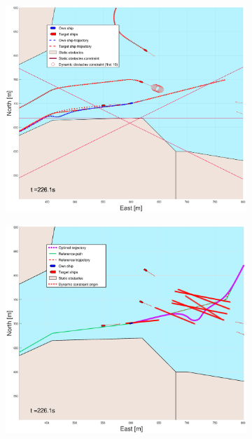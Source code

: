 \begin{figure}[ht!]\ContinuedFloat
    \begin{subfigure}[b]{0.49\textwidth}
        \centering
        \includegraphics[width=\textwidth]{Images/Figures/Trheimfjord/_Simple_1fig1_time=226}
    \end{subfigure}
    \hfill
    \begin{subfigure}[b]{0.499\textwidth}
        \centering
        \includegraphics[width=\textwidth]{Images/Figures/Trheimfjord/_Simple_1fig999_time=226}

\end{subfigure}
\end{figure}
